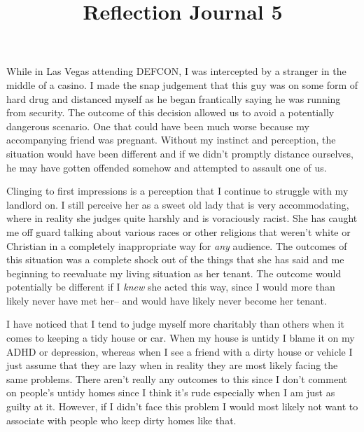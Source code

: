 \documentclass[12pt]{article}
\begin{document}
\title{Reflection Journal 5}


\par
While in Las Vegas attending DEFCON, I was intercepted by a stranger in the middle of a casino. I made the snap judgement that this guy was on some form of hard drug and distanced myself as he began frantically saying he was running from security. The outcome of this decision allowed us to avoid a potentially dangerous scenario. One that could have been much worse because my accompanying friend was pregnant. Without my instinct and perception, the situation would have been different and if we didn't promptly distance ourselves, he may have gotten offended somehow and attempted to assault one of us.
\par
Clinging to first impressions is a perception that I continue to struggle with my landlord on. I still perceive her as a sweet old lady that is very accommodating, where in reality she judges quite harshly and is voraciously racist. She has caught me off guard talking about various races or other religions that weren't white or Christian in a completely inappropriate way for \emph{any} audience. The outcomes of this situation was a complete shock out of the things that she has said and me beginning to reevaluate my living situation as her tenant. The outcome would potentially be different if I \emph{knew} she acted this way, since I would more than likely never have met her-- and would have likely never become her tenant. 
\par
I have noticed that I tend to judge myself more charitably than others when it comes to keeping a tidy house or car. When my house is untidy I blame it on my ADHD or depression, whereas when I see a friend with a dirty house or vehicle I just assume that they are lazy when in reality they are most likely facing the same problems. There aren't really any outcomes to this since I don't comment on people's untidy homes since I think it's rude especially when I am just as guilty at it. However, if I didn't face this problem I would most likely not want to associate with people who keep dirty homes like that.
\end{document}

